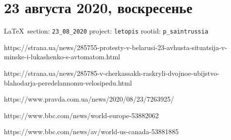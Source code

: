  
 

\section{23 августа 2020, воскресенье}
\label{sec:23_08_2020}


\vspace{0.5cm}
 {\ifDEBUG\small\LaTeX~section: \verb|23_08_2020| project: \verb|letopis| rootid: \verb|p_saintrussia| \fi}
\vspace{0.5cm}

https://strana.ua/news/285755-protesty-v-belarusi-23-avhusta-situatsija-v-minske-i-lukashenko-s-avtomatom.html

https://strana.ua/news/285785-v-cherkassakh-raskryli-dvojnoe-ubijstvo-blahodarja-peredelannomu-velosipedu.html

https://www.pravda.com.ua/news/2020/08/23/7263925/

https://www.bbc.com/news/world-europe-53882062

https://www.bbc.com/news/av/world-us-canada-53881885
  
